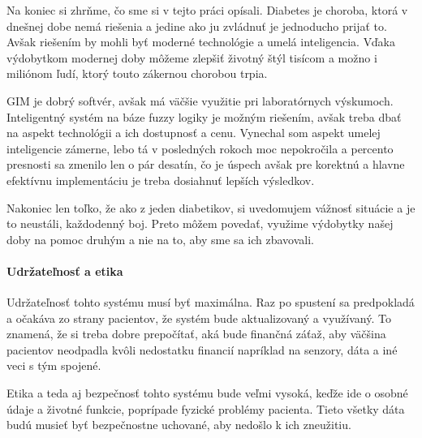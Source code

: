 Na koniec si zhrňme, čo sme si v tejto práci opísali. Diabetes je choroba, ktorá v dnešnej dobe nemá riešenia a jedine ako ju zvládnuť je jednoducho prijať to. Avšak riešením by mohli byť moderné technológie a umelá inteligencia.
Vďaka výdobytkom modernej doby môžeme zlepšiť životný štýl tisícom a možno i miliónom ľudí, ktorý touto zákernou chorobou trpia.

GIM je dobrý softvér, avšak má väčšie využitie pri laboratórnych výskumoch. Inteligentný systém na báze fuzzy logiky je možným riešením, avšak treba dbať na aspekt technológii a ich dostupnosť a cenu. Vynechal som aspekt umelej inteligencie zámerne, lebo tá v posledných rokoch moc nepokročila a percento presnosti sa zmenilo len o pár desatín, čo je úspech avšak pre korektnú a hlavne efektívnu implementáciu je treba dosiahnuť lepších výsledkov.

Nakoniec len toľko, že ako z jeden diabetikov, si uvedomujem vážnosť situácie a je to neustáli, každodenný boj.
Preto môžem povedať, využime výdobytky našej doby na pomoc druhým a nie na to, aby sme sa ich zbavovali.

\paragraph{Udržateľnosť a etika }
Udržateľnosť tohto systému musí byť maximálna. Raz po spustení sa predpokladá a očakáva zo strany pacientov, že systém bude aktualizovaný a využívaný. To znamená, že si treba dobre prepočítať, aká bude finančná záťaž, aby väčšina pacientov neodpadla kvôli nedostatku financií napríklad na senzory, dáta a iné veci s tým spojené.

Etika a teda aj bezpečnosť tohto systému bude veľmi vysoká, keďže ide o osobné údaje a životné funkcie, poprípade fyzické problémy pacienta. Tieto všetky dáta budú musieť byť bezpečnostne uchované, aby nedošlo k ich zneužitiu.
